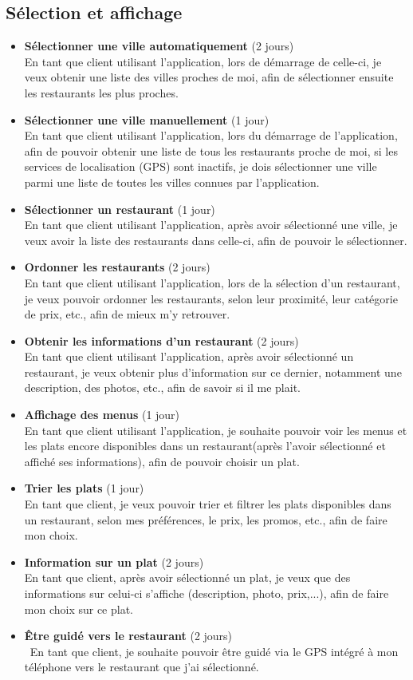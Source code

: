\documentclass[10pt,a4paper]{article}
\begin{document}
\subsection{Sélection et affichage}
\begin{itemize}
\item \textbf{Sélectionner une ville automatiquement} (2 jours)\\
En tant que client utilisant l'application, lors de démarrage de celle-ci, je veux obtenir une liste des villes proches de moi, afin de sélectionner ensuite les restaurants les plus proches.
\item \textbf{Sélectionner une ville manuellement} (1 jour)\\
En tant que client utilisant l'application, lors du démarrage de l'application, afin de pouvoir obtenir une liste de tous les restaurants proche de moi, si les services de localisation (GPS) sont inactifs, je dois sélectionner une ville parmi une liste de toutes les villes connues par l'application.
\item \textbf{Sélectionner un restaurant} (1 jour)\\
En tant que client utilisant l'application, après avoir sélectionné une ville, je veux avoir la liste des restaurants dans celle-ci, afin de pouvoir le sélectionner.
\item \textbf{Ordonner les restaurants} (2 jours)\\
En tant que client utilisant l'application, lors de la sélection d'un restaurant, je veux pouvoir ordonner les restaurants, selon leur proximité, leur catégorie de prix, etc., afin de mieux m'y retrouver.
\item \textbf{Obtenir les informations d'un restaurant} (2 jours)\\
En tant que client utilisant l'application, après avoir sélectionné un restaurant, je veux obtenir plus d'information sur ce dernier, notamment une description, des photos, etc., afin de savoir si il me plait.
\item \textbf{Affichage des menus} (1 jour)\\
En tant que client utilisant l'application, je souhaite pouvoir voir les menus et les plats encore disponibles dans un restaurant(après l'avoir sélectionné et affiché ses informations), afin de pouvoir choisir un plat.
\item \textbf{Trier les plats} (1 jour)\\
En tant que client, je veux pouvoir trier et filtrer les plats disponibles dans un restaurant, selon mes préférences, le prix, les promos, etc., afin de faire mon choix.
\item \textbf{Information sur un plat} (2 jours)\\
En tant que client, après avoir sélectionné un plat, je veux que des informations sur celui-ci s'affiche (description, photo, prix,...), afin de faire mon choix sur ce plat.
\item \textbf{Être guidé vers le restaurant} (2 jours)\\\
En tant que client, je souhaite pouvoir être guidé via le GPS intégré à mon téléphone vers le restaurant que j'ai sélectionné.
\end{itemize}
\end{document}
